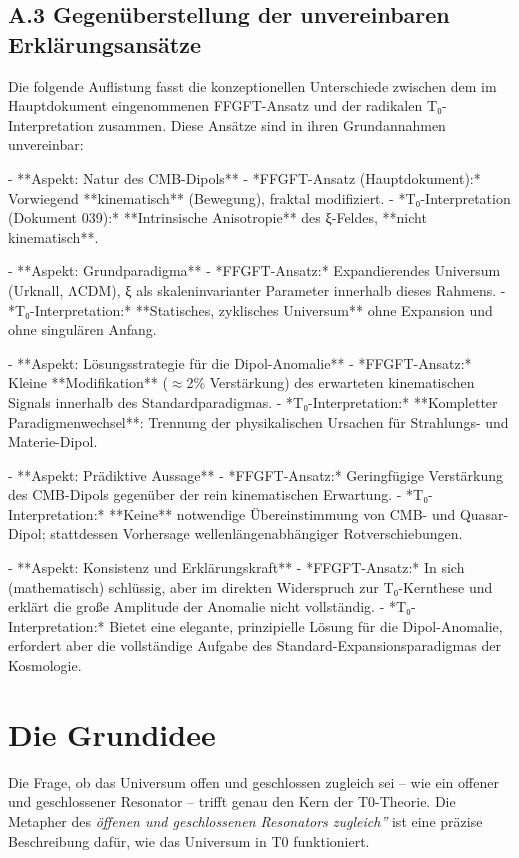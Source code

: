 \documentclass[12pt,a4paper]{article}
\begin{document}
	\subsection*{A.3 Gegenüberstellung der unvereinbaren Erklärungsansätze}
	
	Die folgende Auflistung fasst die konzeptionellen Unterschiede zwischen dem im Hauptdokument eingenommenen FFGFT-Ansatz und der radikalen T₀-Interpretation zusammen. Diese Ansätze sind in ihren Grundannahmen unvereinbar:
	
	- **Aspekt: Natur des CMB-Dipols**
	- *FFGFT-Ansatz (Hauptdokument):* Vorwiegend **kinematisch** (Bewegung), fraktal modifiziert.
	- *T₀-Interpretation (Dokument 039):* **Intrinsische Anisotropie** des ξ-Feldes, **nicht kinematisch**.
	
	- **Aspekt: Grundparadigma**
	- *FFGFT-Ansatz:* Expandierendes Universum (Urknall, ΛCDM), ξ als skaleninvarianter Parameter innerhalb dieses Rahmens.
	- *T₀-Interpretation:* **Statisches, zyklisches Universum** ohne Expansion und ohne singulären Anfang.
	
	- **Aspekt: Lösungsstrategie für die Dipol-Anomalie**
	- *FFGFT-Ansatz:* Kleine **Modifikation** ($\approx$2\% Verstärkung) des erwarteten kinematischen Signals innerhalb des Standardparadigmas.
	- *T₀-Interpretation:* **Kompletter Paradigmenwechsel**: Trennung der physikalischen Ursachen für Strahlungs- und Materie-Dipol.
	
	- **Aspekt: Prädiktive Aussage**
	- *FFGFT-Ansatz:* Geringfügige Verstärkung des CMB-Dipols gegenüber der rein kinematischen Erwartung.
	- *T₀-Interpretation:* **Keine** notwendige Übereinstimmung von CMB- und Quasar-Dipol; stattdessen Vorhersage wellenlängenabhängiger Rotverschiebungen.
	
	- **Aspekt: Konsistenz und Erklärungskraft**
	- *FFGFT-Ansatz:* In sich (mathematisch) schlüssig, aber im direkten Widerspruch zur T₀-Kernthese und erklärt die große Amplitude der Anomalie nicht vollständig.
	- *T₀-Interpretation:* Bietet eine elegante, prinzipielle Lösung für die Dipol-Anomalie, erfordert aber die vollständige Aufgabe des Standard-Expansionsparadigmas der Kosmologie.
	
	\section*{Die Grundidee}
	
	Die Frage, ob das Universum offen und geschlossen zugleich sei – wie ein offener und geschlossener Resonator – trifft genau den Kern der T0-Theorie. Die Metapher des \textit{öffenen und geschlossenen Resonators zugleich''} ist eine präzise Beschreibung dafür, wie das Universum in T0 funktioniert.
	
\end{document}
